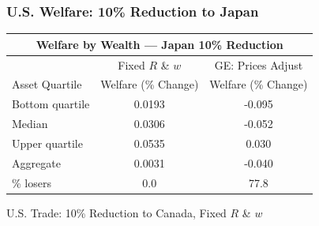\documentclass[9pt,pdftex,aspectratio=1610]{beamer}
\theoremstyle{definition}
\begin{document}
\begin{frame}[t]
\frametitle{U.S. Welfare: 10\% Reduction to Japan}
\begin{table}[t]
\footnotesize
\setlength {\tabcolsep}{6.05mm}
\renewcommand{\arraystretch}{1.80}
\begin{center}
\begin{tabular}{l c c}
\multicolumn{3}{c}{\small \textbf{Welfare by Wealth --- Japan {\color{red} 10\%} Reduction}}\\
\hline
\hline
& \footnotesize  Fixed $R$ \& $w$ & GE: Prices Adjust \\
\cmidrule(lr){2-2}  \cmidrule(lr){3-3}
\footnotesize  Asset Quartile & \footnotesize  Welfare (\% Change) & \footnotesize  Welfare (\% Change) \\
\footnotesize  Bottom quartile  & 0.0193 & -0.095 \\
\footnotesize  Median & 0.0306 & -0.052 \\
\footnotesize  Upper quartile  & 0.0535 & 0.030  \\
\footnotesize  Aggregate & 0.0031 & -0.040 \\
\cmidrule(lr){2-2}  \cmidrule(lr){3-3}
\footnotesize  \% losers & 0.0 & 77.8\\
\hline
\end{tabular}
\end{center}
\end{table}
\end{frame}


\begin{frame}[t]{U.S. Trade: 10\% Reduction to Canada, {\color{red} Fixed $R$ \& $w$} }

\begin{figure}[t]
\end{figure}
\end{frame}
\end{document}
